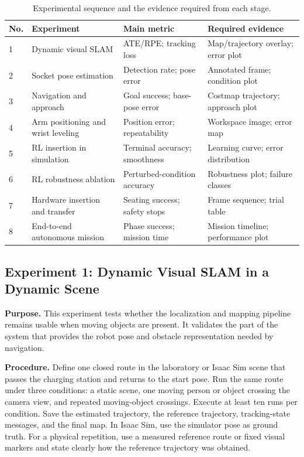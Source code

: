 \begin{table}[!htbp]
\centering
\caption{Experimental sequence and the evidence required from each stage.}
\label{exp:tab:overview}
\small
\setlength{\tabcolsep}{4pt}
\begin{tabular}{@{}p{}>{\raggedright\arraybackslash}p{}>{\raggedright\arraybackslash}p{}>{\raggedright\arraybackslash}p{}@{}}
\toprule
No. & Experiment & Main metric & Required evidence \\
\midrule
1 & Dynamic visual SLAM & ATE/RPE; tracking loss & Map/trajectory overlay; error plot \\
2 & Socket pose estimation & Detection rate; pose error & Annotated frame; condition plot \\
3 & Navigation and approach & Goal success; base-pose error & Costmap trajectory; approach plot \\
4 & Arm positioning and wrist leveling & Position error; repeatability & Workspace image; error map \\
5 & RL insertion in simulation & Terminal accuracy; smoothness & Learning curve; error distribution \\
6 & RL robustness ablation & Perturbed-condition accuracy & Robustness plot; failure classes \\
7 & Hardware insertion and transfer & Seating success; safety stops & Frame sequence; trial table \\
8 & End-to-end autonomous mission & Phase success; mission time & Mission timeline; performance plot \\
\bottomrule
\end{tabular}
\end{table}

\subsection{Experiment 1: Dynamic Visual SLAM in a Dynamic Scene}\label{exp:sec:slam}

\textbf{Purpose.} This experiment tests whether the localization and mapping pipeline remains usable when moving objects are present. It validates the part of the system that provides the robot pose and obstacle representation needed by navigation.

\textbf{Procedure.} Define one closed route in the laboratory or Isaac Sim scene that passes the charging station and returns to the start pose. Run the same route under three conditions: a static scene, one moving person or object crossing the camera view, and repeated moving-object crossings. Execute at least ten runs per condition. Save the estimated trajectory, the reference trajectory, tracking-state messages, and the final map. In Isaac Sim, use the simulator pose as ground truth. For a physical repetition, use a measured reference route or fixed visual markers and state clearly how the reference trajectory was obtained.

